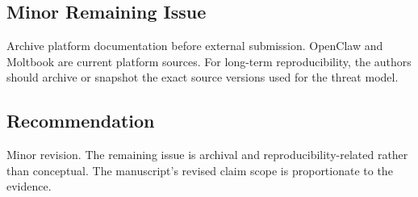 \subsection*{Minor Remaining Issue}

Archive platform documentation before external submission. OpenClaw and Moltbook are current platform sources. For long-term reproducibility, the authors should archive or snapshot the exact source versions used for the threat model.

\subsection*{Recommendation}

Minor revision. The remaining issue is archival and reproducibility-related rather than conceptual. The manuscript's revised claim scope is proportionate to the evidence.
